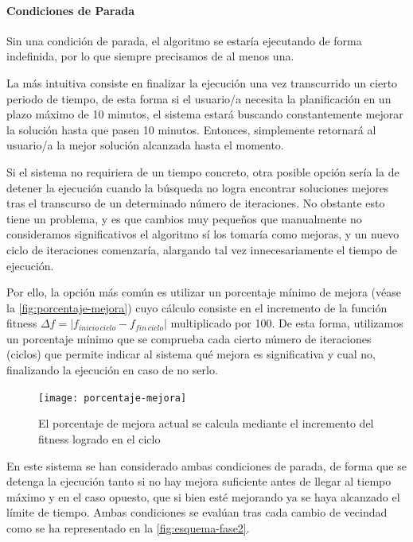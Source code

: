 \paragraph{Condiciones de Parada}
\label{apartado:condiciones-parada}

Sin una condición de parada, el algoritmo se estaría ejecutando de forma indefinida, por lo que siempre precisamos de al menos una.

La más intuitiva consiste en finalizar la ejecución una vez transcurrido un cierto periodo de tiempo, de esta forma si el usuario/a necesita la planificación en un plazo máximo de 10 minutos, el sistema estará buscando constantemente mejorar la solución hasta que pasen 10 minutos. Entonces, simplemente retornará al usuario/a la mejor solución alcanzada hasta el momento.

Si el sistema no requiriera de un tiempo concreto, otra posible opción sería la de detener la ejecución cuando la búsqueda no logra encontrar soluciones mejores tras el transcurso de un determinado número de iteraciones. No obstante esto tiene un problema, y es que cambios muy pequeños que manualmente no consideramos significativos el algoritmo sí los tomaría como mejoras, y un nuevo ciclo de iteraciones comenzaría, alargando tal vez innecesariamente el tiempo de ejecución. 

Por ello, la opción más común es utilizar un porcentaje mínimo de mejora (véase la \autoref{fig:porcentaje-mejora}) cuyo cálculo consiste en el incremento de la función fitness $\Delta f = |f_{inicio\, ciclo}-f_{fin\, ciclo}|$ multiplicado por 100. De esta forma, utilizamos un porcentaje mínimo que se comprueba cada cierto número de iteraciones (ciclos) que permite indicar al sistema qué mejora es significativa y cual no, finalizando la ejecución en caso de no serlo.

\begin{figure}
    \centering
    \texttt{[image: porcentaje-mejora]}
    \caption{El porcentaje de mejora actual se calcula mediante el incremento del fitness logrado en el ciclo}
    \label{fig:porcentaje-mejora}
\end{figure}

En este sistema se han considerado ambas condiciones de parada, de forma que se detenga la ejecución tanto si no hay mejora suficiente antes de llegar al tiempo máximo y en el caso opuesto, que si bien esté mejorando ya se haya alcanzado el límite de tiempo. Ambas condiciones se evalúan tras cada cambio de vecindad como se ha representado en la \autoref{fig:esquema-fase2}.

